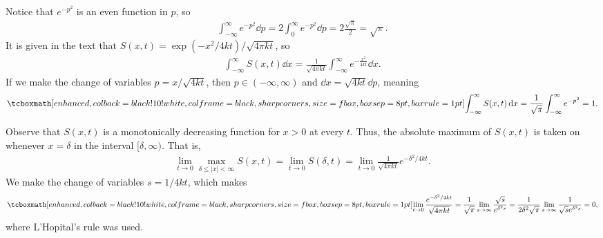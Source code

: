
Notice that $e^{-p^2}$ is an even function in $p$, so
\begin{eqnarray}
    \label{eq:gauss-int}
    \int_{-\infty}^{\infty} e^{-p^2} \dd{p} = 2\int_{0}^{\infty} e^{-p^2} \dd{p} = 2\frac{\sqrt{\pi}}{2} = \sqrt{\pi}
.\end{eqnarray}
It is given in the text that $S(x,t) = \exp(-x^2/4kt)/\sqrt{4 \pi k t}$, so
\begin{eqnarray}
    \label{eq:int-source}
    \int_{-\infty}^{\infty} S(x,t) \dd{x} = \frac{1}{\sqrt{4 \pi k t}}\int_{-\infty}^{\infty} e^{-\frac{x^2}{4kt}} \dd{x}
.\end{eqnarray}
If we make the change of variables $p = x/\sqrt{4kt}$, then $p \in (-\infty,\infty)$ and $\dd{x} = \sqrt{4 k t}\dd{p}$, meaning
\begin{eqnarray}
    \label{eq:int-source-sub}
    \eqbox{
    \int_{-\infty}^{\infty} S(x,t) \dd{x} = \frac{1}{\sqrt{\pi}} \int_{-\infty}^{\infty} e^{-p^2} = 1
}
.\end{eqnarray}



Observe that $S(x,t)$ is a monotonically decreasing function for $x > 0$ at every $t$.
Thus, the absolute maximum of $S(x,t)$ is taken on whenever $x = \delta$ in the interval $[\delta,\infty)$.
That is,
\begin{eqnarray}
    \label{eq:max-S}
    \lim_{t \rightarrow 0} \max_{\delta \leq |x| < \infty} S(x,t) = \lim_{t \rightarrow 0} S(\delta,t) = \lim_{t \rightarrow 0} \frac{1}{\sqrt{4 \pi k t}}e^{-\delta^2/4 k t}
.\end{eqnarray}
We make the change of variables $s = 1/4kt$, which makes 
\begin{eqnarray}
    \label{eq:limit}
    \eqbox{
    \lim_{t \rightarrow 0} \frac{e^{-\delta^2/4kt}}{\sqrt{4 \pi k t}} = \frac{1}{\sqrt{\pi}}\lim_{s \rightarrow \infty} \frac{\sqrt{s}}{e^{\delta^2 s}} = \frac{1}{2\delta^2\sqrt{\pi}} \lim_{s \rightarrow \infty} \frac{1}{\sqrt{s}e^{\delta^2 s}} = 0
}
,\end{eqnarray}
where L'Hopital's rule was used.


